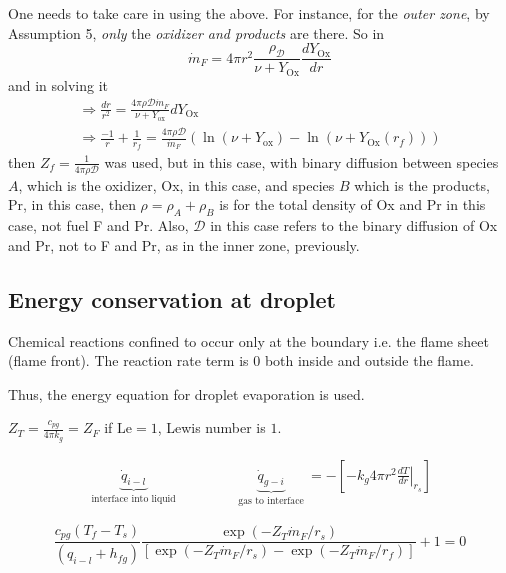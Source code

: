 \documentclass[10pt]{amsart}
\begin{document}
\begin{multicols*}{2}
One needs to take care in using the above.  For instance, for the \emph{outer zone}, by Assumption 5, \emph{only} the \emph{oxidizer and products} are there.  
So in 
\[
\dot{m}_F = 4\pi r^2 \frac{\rho_{\mathcal{D}}}{\nu + Y_{\text{Ox}}} \frac{dY_{\text{Ox}}}{dr}
\]
and in solving it
\[
\begin{gathered}
  \Longrightarrow \frac{dr}{r^2} = \frac{4\pi \rho \mathcal{D}\dot{m}_F}{ \nu + Y_{\text{ox}} } dY_{\text{Ox}} \\
\Longrightarrow \frac{-1}{r} + \frac{1}{r_f} = \frac{4\pi \rho \mathcal{D}}{\dot{m}_F} \left( \ln{(\nu + Y_{\text{ox}} ) }  - \ln{ (\nu + Y_{\text{Ox}}(r_f)) } \right)
\end{gathered}
\]
then $Z_f = \frac{1}{4\pi \rho \mathcal{D}}$ was used, but in this case, with binary diffusion between species $A$, which is the oxidizer, Ox, in this case, and species $B$ which is the products, Pr, in this case, then $\rho = \rho_A + \rho_B$ is for the total density of Ox and Pr in this case, not fuel F and Pr.  Also, $\mathcal{D}$ in this case refers to the binary diffusion of Ox and Pr, not to F and Pr, as in the inner zone, previously.  

\subsection{Energy conservation at droplet}
Chemical reactions confined to occur only at the boundary i.e. the flame sheet (flame front).  The reaction rate term is $0$ both inside and outside the flame.  

Thus, the energy equation for droplet evaporation is used.  

$Z_T = \frac{c_{pg}}{ 4\pi k_g} = Z_F$ if $\text{Le}=1$, Lewis number is $1$.  

\[
\begin{gathered}
  \underbrace{ \dot{q}_{i-l} }_{ \text{ interface into liquid } } \qquad \qquad \underbrace{ \dot{q}_{g-i} }_{ \text{ gas to interface } } = - \left[ - k_g 4\pi r^2 \left. \frac{dT}{dr} \right|_{r_s} \right]
\end{gathered}
\]

\begin{equation}\label{Eq:DropletIII}
  \boxed{ \frac{ c_{pg} (T_f- T_s) }{(q_{i-l} + h_{fg}  )} \frac{ \exp{ (-Z_T \dot{m}_F/r_s ) } }{ \left[ \exp{ \left( - Z_T\dot{m}_F / r_s  \right) } - \exp{ \left( -Z_T \dot{m}_F /r_f \right) } \right] }  + 1 = 0 }
\end{equation}




\end{multicols*}
\end{document}

